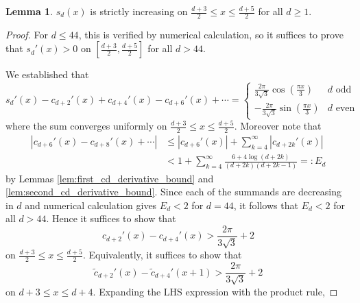 \documentclass[12pt]{amsart}
\theoremstyle{definition}
\newtheorem{lemma}[theorem]{Lemma}
\begin{document}
\begin{lemma}
    $s_d(x)$ is strictly increasing on $\frac{d+3}{2}\leq x \leq \frac{d+5}{2}$ for all $d\geq 1$.

\label{lem:sd_increasing_intvofsize1}
 \end{lemma}
 \begin{proof}
    For $d\leq 44$, this is verified by numerical calculation, so it suffices to prove that $s_d'(x) > 0 $ on $[\frac{d+3}{2},\frac{d+5}{2}]$ for all $d> 44$. 
    
    We established that
    $$ s_d'(x) - c_{d+2}'(x) + c_{d+4}'(x) - c_{d+6}'(x) + \cdots =  \begin{cases}
        \frac{2\pi}{3\sqrt{3}}\cos\left(\frac{\pi x}{3}\right) & d \text{ odd} \\
        -\frac{2\pi}{3\sqrt{3}}\sin\left(\frac{\pi x}{3}\right) & d \text{ even}
    \end{cases} $$
    where the sum converges uniformly on $\frac{d+3}{2}\leq x \leq \frac{d+5}{2}$. Moreover note that 
    \begin{align*}
        |c_{d+6}'(x)-c_{d+8}'(x)+\cdots|
         &\leq |c_{d+6}'(x)| + \sum_{k=4}^{\infty}|c_{d+2k}'(x)|\\
         &< 1 + \sum_{k=4}^{\infty}\frac{6+4\log(d+2k)}{(d+2k)(d+2k-1)} =: E_d	 
    \end{align*}
    by Lemmas \ref{lem:first_cd_derivative_bound} and \ref{lem:second_cd_derivative_bound}. Since each of the summands are decreasing in $d$ and numerical calculation gives $E_d<2$ for $d= 44$, it follows that $E_d<2$ for all $d> 44$. Hence it suffices to show that
    $$ c_{d+2}'(x) - c_{d+4}'(x) > \frac{2\pi}{3\sqrt{3}} + 2 $$
    on $\frac{d+3}{2}\leq x \leq \frac{d+5}{2}$. Equivalently, it suffices to show that $$ \tilde{c}_{d+2}'(x)-\tilde{c}_{d+4}'(x+1) > \frac{2\pi}{3\sqrt{3}} + 2 $$
    on $d+3\leq x\leq d+4$. Expanding the LHS expression with the product rule,
    

\end{proof}
\end{document}
